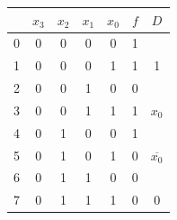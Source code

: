 \documentclass[a4paper,12pt]{article}
\begin{document}
        \begin{table}[H]
            \centering
            \begin{tabular}{|c|c|c|c|c|c|c|}
            \hline
                                    & $x_3$                     & $x_2$                     & $x_1$                     & $x_0$                     & $f$                       & $D$                                \\ \hline
            \cellcolor[HTML]{32CB00}0  & \cellcolor[HTML]{32CB00}0 & \cellcolor[HTML]{32CB00}0 & \cellcolor[HTML]{32CB00}0 & \cellcolor[HTML]{32CB00}0 & \cellcolor[HTML]{32CB00}1 &                                    \\ \cline{1-6}
            \cellcolor[HTML]{32CB00}1  & \cellcolor[HTML]{32CB00}0 & \cellcolor[HTML]{32CB00}0 & \cellcolor[HTML]{32CB00}0 & \cellcolor[HTML]{32CB00}1 & \cellcolor[HTML]{32CB00}1 & \multirow{-2}{*}{1}                \\ \hline
            2                          & 0                         & 0                         & 1                         & 0                         & 0                         &                                    \\ \cline{1-6}
            \cellcolor[HTML]{32CB00}3  & \cellcolor[HTML]{32CB00}0 & \cellcolor[HTML]{32CB00}0 & \cellcolor[HTML]{32CB00}1 & \cellcolor[HTML]{32CB00}1 & \cellcolor[HTML]{32CB00}1 & \multirow{-2}{*}{$x_0$}            \\ \hline
            \cellcolor[HTML]{32CB00}4  & \cellcolor[HTML]{32CB00}0 & \cellcolor[HTML]{32CB00}1 & \cellcolor[HTML]{32CB00}0 & \cellcolor[HTML]{32CB00}0 & \cellcolor[HTML]{32CB00}1 &                                    \\ \cline{1-6}
            5                          & 0                         & 1                         & 0                         & 1                         & 0                         & \multirow{-2}{*}{$\overline{x_0}$} \\ \hline
            6                          & 0                         & 1                         & 1                         & 0                         & 0                         &                                    \\ \cline{1-6}
            7                          & 0                         & 1                         & 1                         & 1                         & 0                         & \multirow{-2}{*}{0}                \\ \hline

\end{tabular}
\end{table}
\end{document}
